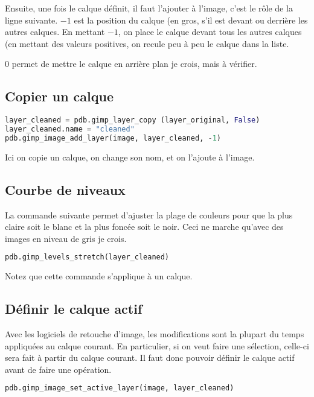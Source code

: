 \documentclass[a4paper,twoside]{article}
\begin{document}
Ensuite, une fois le calque définit, il faut l'ajouter à l'image, c'est le rôle de la ligne suivante. $-1$ est la position du calque (en gros, s'il est devant ou derrière les autres calques. En mettant $-1$, on place le calque devant tous les autres calques (en mettant des valeurs positives, on recule peu à peu le calque dans la liste. 

\begin{remarque}
$0$ permet de mettre le calque en arrière plan je crois, mais à vérifier.
\end{remarque}

\subsection{Copier un calque}
\begin{lstlisting}[language=Python]
layer_cleaned = pdb.gimp_layer_copy (layer_original, False)
layer_cleaned.name = "cleaned"
pdb.gimp_image_add_layer(image, layer_cleaned, -1)
\end{lstlisting}
Ici on copie un calque, on change son nom, et on l'ajoute à l'image. 

\subsection{Courbe de niveaux}
La commande suivante permet d'ajuster la plage de couleurs pour que la plus claire soit le blanc et la plus foncée soit le noir. Ceci ne marche qu'avec des images en niveau de gris je crois.

\begin{lstlisting}[language=Python]
pdb.gimp_levels_stretch(layer_cleaned)
\end{lstlisting}

Notez que cette commande s'applique à un calque.

\subsection{Définir le calque actif}
Avec les logiciels de retouche d'image, les modifications sont la plupart du temps appliquées au calque courant. En particulier, si on veut faire une sélection, celle-ci sera fait à partir du calque courant. Il faut donc pouvoir définir le calque actif avant de faire une opération. 

\begin{lstlisting}[language=Python]
pdb.gimp_image_set_active_layer(image, layer_cleaned)
\end{lstlisting}
\end{document}
